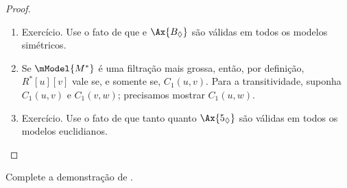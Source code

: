 \documentclass[../../../include/open-logic-section]{subfiles}
\begin{document}
\begin{proof}
\begin{enumerate}
  \item Exercício. Use o fato de que  e $\Ax{B_\Diamond}$ são
    válidas em todos os modelos simétricos.
  \item Se $\mModel{M^*}$ é uma filtração mais grossa, então, por
    definição, $R^*[u][v]$ vale se, e somente se, $C_1(u,v)$. Para a
    transitividade, suponha $C_1(u,v)$ e $C_1(v,w)$; precisamos mostrar
    $C_1(u,w)$. 
  \item Exercício. Use o fato de que tanto  quanto $\Ax{5_\Diamond}$
    são válidas em todos os modelos euclidianos.
\end{enumerate}
\end{proof}

\begin{prob}
  Complete a demonstração de .
\end{prob}
\end{document}
